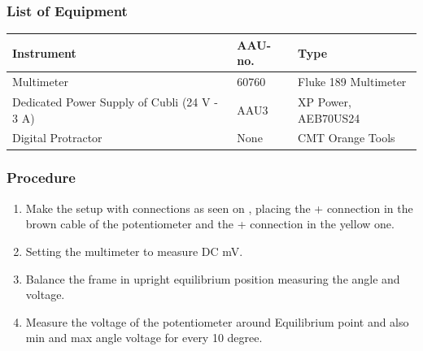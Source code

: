 \subsubsection{List of Equipment}
\begin{table}[H]
	\begin{tabular}{|l|l|p{4.3cm}|}
		\hline%
		\textbf{Instrument}                                  &  \textbf{AAU-no.}  &  \textbf{Type}                       \\
		\hline%
		Multimeter                                           &  60760           &  Fluke 189 Multimeter		                   \\
		\hline%
		Dedicated Power Supply of Cubli \small{(24 V - 3 A)} &  AAU3                   &  XP Power, AEB70US24                 \\
		\hline%
		Digital Protractor                                   &  None               & CMT Orange Tools     \\
		\hline%
	\end{tabular}
\end{table}

\subsubsection{Procedure}
\begin{enumerate}
	\item Make the setup with connections as seen on , placing the + connection in the brown cable of the potentiometer and the + connection in the yellow one.
	\item Setting the multimeter to measure DC mV.
	\item Balance the frame in upright equilibrium position measuring the angle and voltage.
	\item Measure the voltage of the potentiometer around Equilibrium point and also min and max angle voltage for every 10 degree.
\end{enumerate}


